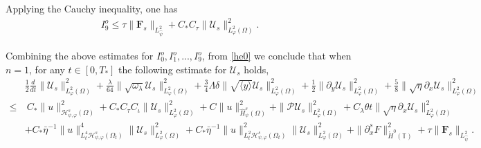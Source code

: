 \documentclass{amsart}
\numberwithin{equation}{section}
\newcommand\y{{{\langle y \rangle}}}
\begin{document}
 Applying the Cauchy inequality, one has
\begin{align*}
I_{9}^{o}\leq \tau\|\mathbf{F}_{s}\|_{L_{\hat{\psi}}^{2}}+C_{*}C_{\tau}\|\mathcal{U}_{s}\|_{L_{\varphi}^{2}(\Omega)}^{2}.
\end{align*}

Combining the above estimates for $I_{0}^{o},I_{1}^{o},...,I_{9}^{o}$, from \eqref{he0} we conclude that when $n=1$, for any $t\in[0,T_{*}]$ the following estimate for $\mathcal{U}_{s}$ holds,
\begin{align}\label{He0}
&\frac{1}{2}\frac{d}{dt}\|\mathcal{U}_{s}\|_{L_{\varphi}^{2}(\Omega)}^{2}
+\frac{\lambda}{64}\|\sqrt{\omega_{\lambda}}\mathcal{U}_{s}\|_{L_{\varphi}^{2}(\Omega)}^{2}
+\frac{3}{4}\Lambda\delta\|\sqrt{\y}\mathcal{U}_{s}\|_{L_{\varphi}^{2}(\Omega)}^{2}
+\frac{1}{2}\|\partial_{y}\mathcal{U}_{s}\|_{L_{\varphi}^{2}(\Omega)}^{2}
+\frac{5}{8}\|\sqrt{\eta}\partial_{x}\mathcal{U}_{s}\|_{L_{\varphi}^{2}(\Omega)}^{2}\\
\leq&~C_{*}\|u\|_{\mathcal{H}_{\psi,\varphi}^{s}(\Omega)}^{2}
     +C_{*}C_{\tau}C_{\iota}\|\mathcal{U}_{s}\|_{L_{\varphi}^{2}(\Omega)}^{2}
     +C\|u\|_{\hat{H}_{\psi}^{s}(\Omega)}^{2}
     +\|\mathcal{P}\mathcal{U}_{s}\|_{L_{\varphi}^{2}(\Omega)}^{2}
     +C_{\lambda}\theta t\|\sqrt{\eta}\partial_{x}\mathcal{U}_{s}\|_{L_{\varphi}^{2}(\Omega)}^{2}\nonumber\\
    &+C_{*}\bar{\eta}^{-1}\|u\|_{L_{t}^{4}\mathcal{H}_{\psi,\varphi}^{s}(\Omega_{t})}^{4}\|\mathcal{U}_{s}\|_{L_{\varphi}^{2}(\Omega)}^{2}
     +C_{*}\bar{\eta}^{-1}\|u\|_{L_{t}^{2}\mathcal{H}_{\psi,\varphi}^{s}(\Omega_{t})}^{2}\|\mathcal{U}_{s}\|_{L_{\varphi}^{2}(\Omega)}^{2}
     +\|\partial_{x}^{s}F\|_{\mathring{H}^{0}(\mathbb{T})}^{2}
     +\tau\|\mathbf{F}_{s}\|_{L_{\hat{\psi}}^{2}}.\nonumber
\end{align}
\end{document}
